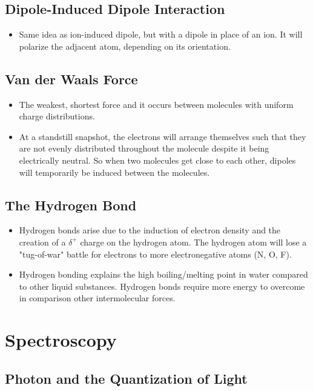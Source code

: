 \documentclass[12pt, letterpaper, twoside]{article}
\begin{document}
\subsection{Dipole-Induced Dipole Interaction}
\begin{itemize}
    \item Same idea as ion-induced dipole, but with a dipole in place of an ion. It will polarize the adjacent atom, depending on its orientation.
\end{itemize}

\subsection{Van der Waals Force}
\begin{itemize}
    \item The weakest, shortest force and it occurs between molecules with uniform charge distributions.
    \item At a standstill snapshot, the electrons will arrange themselves such that they are not evenly distributed throughout the molecule despite it being electrically neutral. So when two molecules get close to each other, dipoles will temporarily be induced between the molecules.
\end{itemize}

\subsection{The Hydrogen Bond}

\begin{itemize}
    \item Hydrogen bonds arise due to the induction of electron density and the creation of a $\delta^+$ charge on the hydrogen atom. The hydrogen atom will lose a "tug-of-war" battle for electrons to more electronegative atoms (N, O, F).
    \item Hydrogen bonding explains the high boiling/melting point in water compared to other liquid substances. Hydrogen bonds require more energy to overcome in comparison other intermolecular forces.
\end{itemize}

\section{Spectroscopy}

\subsection{Photon and the Quantization of Light}
\end{document}
